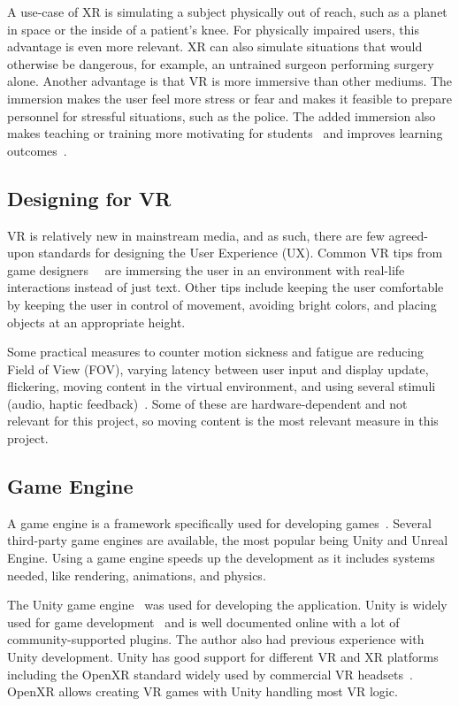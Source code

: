 \documentclass[a4paper]{report}
\begin{document}
A use-case of XR is simulating a subject physically out of reach, such as a planet in space or the inside of a patient's knee. For physically impaired users, this advantage is even more relevant.
XR can also simulate situations that would otherwise be dangerous, for example, an untrained surgeon performing surgery alone.
Another advantage is that VR is more immersive than other mediums. The immersion makes the user feel more stress or fear and makes it feasible to prepare personnel for stressful situations, such as the police.
The added immersion also makes teaching or training more motivating for students~\cite{freina_immersive_2015} and improves learning outcomes~\cite{cynthia_l_foronda_virtual_nodate}.

\subsection{Designing for VR}
VR is relatively new in mainstream media, and as such, there are few agreed-upon standards for designing the User Experience (UX).
Common VR tips from game designers~\cite{vrdesign_best_nodate}~\cite{vrdesignadobe_virtual_nodate} are immersing the user in an environment with real-life interactions instead of just text. Other tips include keeping the user comfortable by keeping the user in control of movement, avoiding bright colors, and placing objects at an appropriate height.

Some practical measures to counter motion sickness and fatigue are reducing Field of View (FOV), varying latency between user input and display update, flickering, moving content in the virtual environment, and using several stimuli (audio, haptic feedback)~\cite{chang_virtual_2020}. 
Some of these are hardware-dependent and not relevant for this project, so moving content is the most relevant measure in this project.

\subsection{Game Engine}
A game engine is a framework specifically used for developing games~\cite{gameengine_what_nodate}. Several third-party game engines are available, the most popular being Unity and Unreal Engine.
Using a game engine speeds up the development as it includes systems needed, like rendering, animations, and physics.

The Unity game engine~\cite{technologies_unity_nodate} was used for developing the application. Unity is widely used for game development~\cite{doucet_game_2021} and is well documented online with a lot of community-supported plugins. The author also had previous experience with Unity development.
Unity has good support for different VR and XR platforms~\cite{technologies_unity_nodate-3} including the OpenXR standard widely used by commercial VR headsets~\cite{noauthor_openxr_2016}. OpenXR allows creating VR games with Unity handling most VR logic.
\end{document}
